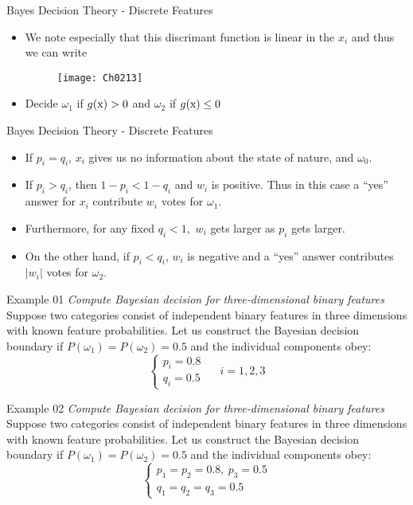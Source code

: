 \begin{frame}{Bayes Decision Theory - Discrete Features}
\begin{itemize}
\item We note especially that this discrimant function is linear in the $x_i$ and thus we can write
\begin{figure}
\texttt{[image: Ch0213]}
\end{figure}
\item Decide $\omega_1$ if $g({\rm x})>0$ and $\omega_2$ if $g({\rm x})\leq 0$
\end{itemize}
\end{frame}

\begin{frame}{Bayes Decision Theory - Discrete Features}
\begin{itemize}
\item If $p_i=q_i$, $x_i$ gives us no information about the state of nature, and $\omega_0$.
\item If $p_i>q_i$, then $1-p_i<1-q_i$ and $w_i$ is positive. Thus in this case a ``yes'' answer for $x_i$ contribute $w_i$ votes for $\omega_1$.
\item Furthermore, for any fixed $q_i<1$,~$w_i$ gets larger as $p_i$ gets larger.
\item On the other hand, if $p_i<q_i$, $w_i$ is negative and a ``yes'' answer contributes $|w_i|$ votes for $\omega_2$.
\end{itemize}
\end{frame}

\begin{frame}{Example 01}
\textit{\color{mycolor2}Compute Bayesian decision for three-dimensional binary features}\\
Suppose two categories consist of independent binary features in three dimensions
with known feature probabilities. Let us construct the Bayesian decision boundary if
$P(\omega_1 ) = P(\omega_2 )=0.5$ and the individual components obey:
\begin{equation}
\left\{ {\begin{array}{*{20}{c}}
{{p_i} = 0.8}\\
{{q_i} = 0.5}
\end{array}} \right.~~~~~~i = 1,2,3\nonumber
\end{equation}
\end{frame}

\begin{frame}{Example 02}
\textit{\color{mycolor2}Compute Bayesian decision for three-dimensional binary features}\\
Suppose two categories consist of independent binary features in three dimensions
with known feature probabilities. Let us construct the Bayesian decision boundary if
$P(\omega_1 ) = P(\omega_2 )=0.5$ and the individual components obey:
\begin{equation}
\left\{ {\begin{array}{*{20}{c}}
{{p_1} = {p_2}=0.8},~p_3=0.5\\
{{q_1} = {q_2} = {q_3} = 0.5}
\end{array}} \right.\nonumber
\end{equation}
\end{frame}


